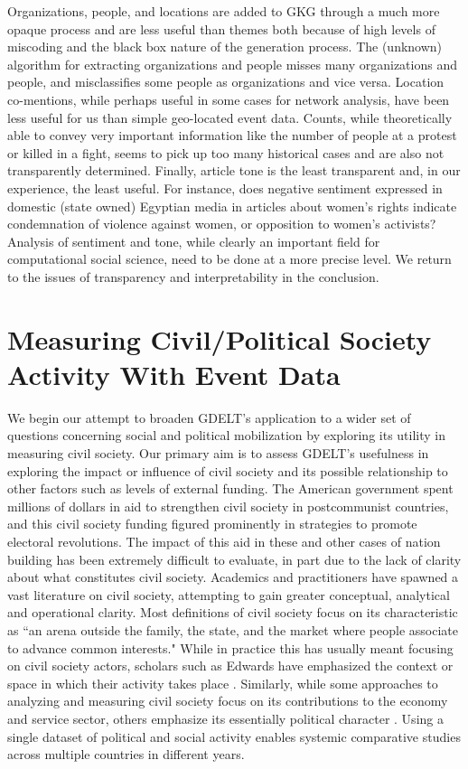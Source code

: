 \documentclass[10pt]{article}
\begin{document}
Organizations, people, and locations are added to GKG through a much more opaque process and are less useful than themes both because of high levels of miscoding and the black box nature of the generation process. The (unknown) algorithm for extracting organizations and people misses many organizations and people, and misclassifies some people as organizations and vice versa. Location co-mentions, while perhaps useful in some cases for network analysis, have been less useful for us than simple geo-located event data. Counts, while theoretically able to convey very important information like the number of people at a protest or killed in a fight, seems to pick up too many historical cases and are also not transparently determined. Finally, article tone is the least transparent and, in our experience, the least useful. For instance, does negative sentiment expressed in domestic (state owned) Egyptian media in articles about women's rights indicate condemnation of violence against women, or opposition to women's activists? Analysis of sentiment and tone, while clearly an important field for computational social science, need to be done at a more precise level. We return to the issues of transparency and interpretability in the conclusion.


\section{Measuring Civil/Political Society Activity With Event Data}

We begin our attempt to broaden GDELT's application to a wider set of questions concerning social and political mobilization by exploring its utility in measuring civil society.  Our primary aim is to assess GDELT's usefulness in exploring the impact or influence of civil society and its possible relationship to other factors such as levels of external funding.  The American government spent millions of dollars in aid to strengthen civil society in postcommunist countries, and this civil society funding figured prominently in strategies to promote electoral revolutions.  The impact of this aid in these and other cases of nation building has been extremely difficult to evaluate, in part due to the lack of clarity about what constitutes civil society.   Academics and practitioners have spawned a vast literature on civil society, attempting to gain greater conceptual, analytical and operational clarity.   Most definitions of civil society focus on its characteristic as ``an arena outside the family, the state, and the market where people associate to advance common interests." \citep{heinrich2004assessing} While in practice this has usually meant focusing on civil society actors, scholars such as Edwards have emphasized the context or space in which their activity takes place \citep{edwards2009civil}.  Similarly, while some approaches to analyzing and measuring civil society focus on its contributions to the economy and service sector, others emphasize its essentially political character \citep{malena2007can}. Using a single dataset of political and social activity enables systemic comparative studies across multiple countries in different years.
\end{document}
